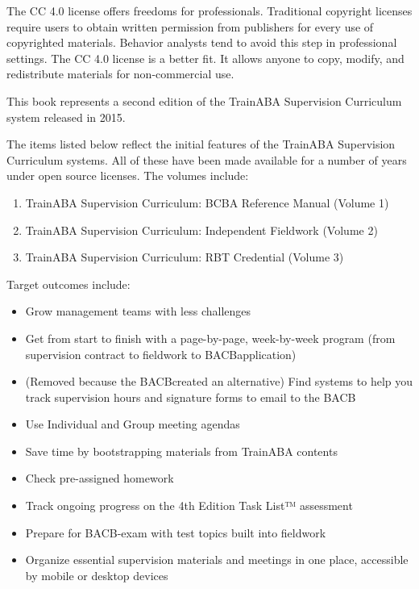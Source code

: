 The CC 4.0 license offers freedoms for professionals. Traditional copyright licenses require users to obtain written permission from publishers for every use of copyrighted materials. Behavior analysts tend to avoid this step in professional settings. The CC 4.0 license is a better fit. It allows anyone to copy, modify, and redistribute materials for non-commercial use. 

This book represents a second edition of the TrainABA Supervision Curriculum system released in 2015.

The items listed below reflect the initial features of the TrainABA Supervision Curriculum systems. All of these have been made available for a number of years under open source licenses. The volumes include:

\begin{enumerate}
\item TrainABA Supervision Curriculum: BCBA Reference Manual (Volume 1)
\item TrainABA Supervision Curriculum: Independent Fieldwork (Volume 2)
\item TrainABA Supervision Curriculum: RBT Credential (Volume 3)
\end{enumerate}

Target outcomes include: 
\begin{itemize}
\item Grow management teams with less challenges
\item Get from start to finish with a page-by-page, week-by-week program (from supervision contract to  fieldwork to BACB\textregistered application) 
\item (Removed because the BACB\textregistered created an alternative) Find systems to help you track supervision hours and signature forms to email to the BACB\textregistered
\item Use Individual and Group meeting agendas
\item Save time by bootstrapping materials from TrainABA contents 
\item Check pre-assigned homework
\item Track ongoing progress on the 4th Edition Task List™ assessment 
\item Prepare for BACB\textregistered-exam with test topics built into fieldwork
\item Organize essential supervision materials and meetings in one place, accessible by mobile or desktop devices
\end{itemize}

